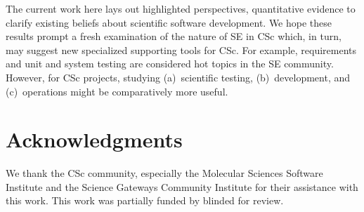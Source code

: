 \documentclass[conference,10pt]{IEEEtran}
\begin{document}
 
 The current work here lays out highlighted perspectives, quantitative evidence to clarify existing beliefs about scientific software development.
 We hope these results  prompt a fresh examination of the nature of SE in  CSc which, in turn, may suggest new specialized supporting tools for CSc.
For example, requirements and unit and system testing  are considered hot topics in the SE community.
However, for CSc projects,   studying  (a)~scientific testing, (b)~development, and
(c)~operations might be comparatively more useful.





\section{Acknowledgments}

We thank the CSc community, especially the Molecular Sciences Software Institute and the Science Gateways Community Institute for
their assistance with this work. This work was partially funded by blinded for review.





\balance
% 


\end{document}
